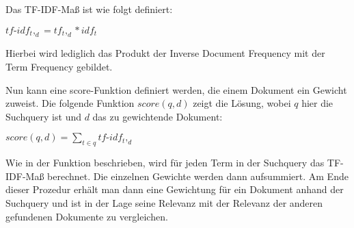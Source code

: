 \begin{defi}[TF-IDF]\label{defi:TF-IDF}
	Das TF-IDF-Maß ist wie folgt definiert:
	\begin{center}
		$tf\text{-}idf_t,_d = tf_t,_d * idf_t$
	\end{center}
	Hierbei wird lediglich das Produkt der Inverse Document Frequency mit der Term Frequency gebildet.
\end{defi}

Nun kann eine score-Funktion definiert werden, die einem Dokument ein Gewicht zuweist. Die folgende Funktion $score(q,d)$ zeigt die Lösung, wobei $q$ hier die Suchquery ist und $d$ das zu gewichtende Dokument: 
\begin{center}
	$score(q,d)=\sum\limits_{t \in q}tf\text{-}idf_t,_d$
\end{center}
\newpage
Wie in der Funktion beschrieben, wird für jeden Term in der Suchquery das TF-IDF-Maß berechnet. Die einzelnen Gewichte werden dann aufsummiert. Am Ende dieser Prozedur erhält man dann eine Gewichtung für ein Dokument anhand der Suchquery und ist in der Lage seine Relevanz mit der Relevanz der anderen gefundenen Dokumente zu vergleichen.